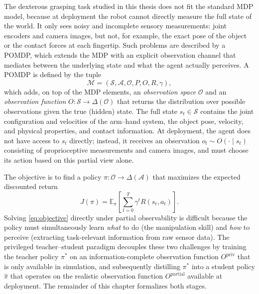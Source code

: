 The dexterous grasping task studied in this thesis does not fit the standard \ac{MDP} model, because at deployment the robot cannot directly measure the full state of the world.
It only sees noisy and incomplete sensory measurements: joint encoders and camera images, but not, for example, the exact pose of the object or the contact forces at each fingertip.
Such problems are described by a \ac{POMDP}, which extends the \ac{MDP} with an explicit observation channel that mediates between the underlying state and what the agent actually perceives.
A \ac{POMDP} is defined by the tuple
%
\begin{equation}\label{eq:pomdp}
    \mathcal{M} = (\mathcal{S}, \mathcal{A}, \mathcal{O}, P, O, R, \gamma),
\end{equation}
%
which adds, on top of the \ac{MDP} elements, an \emph{observation space} $\mathcal{O}$ and an \emph{observation function} $O : \mathcal{S} \to \Delta(\mathcal{O})$ that returns the distribution over possible observations given the true (hidden) state.
The full state $s_t \in \mathcal{S}$ contains the joint configuration and velocities of the arm--hand system, the object pose, velocity, and physical properties, and contact information.
At deployment, the agent does not have access to $s_t$ directly; instead, it receives an observation $o_t \sim O(\cdot \mid s_t)$ consisting of proprioceptive measurements and camera images, and must choose its action based on this partial view alone.

The objective is to find a policy $\pi: \mathcal{O} \to \Delta(\mathcal{A})$ that maximizes the expected discounted return
%
\begin{equation}\label{eq:objective}
    J(\pi) = \mathbb{E}_{\pi}\left[\sum_{t=0}^{T} \gamma^t R(s_t, a_t)\right].
\end{equation}
%
Solving \cref{eq:objective} directly under partial observability is difficult because the policy must simultaneously learn \emph{what} to do (the manipulation skill) and \emph{how} to perceive (extracting task-relevant information from raw sensor data).
The privileged teacher--student paradigm decouples these two challenges by training the teacher policy $\pi^*$ on an information-complete observation function $O^{\text{priv}}$ that is only available in simulation, and subsequently distilling $\pi^*$ into a student policy $\hat{\pi}$ that operates on the realistic observation function $O^{\text{partial}}$ available at deployment.
The remainder of this chapter formalizes both stages.

